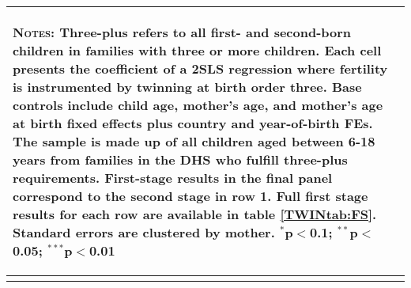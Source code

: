 \begin{table}[!htbp]
\begin{tabular}{lcccc}
\hline\multicolumn{5}{p{10.0cm}}{\begin{footnotesize}\textsc{Notes:} Three-plus refers to all first- and second-born children in families with three or more children.  Each cell presents the coefficient of a 2SLS regression where fertility is instrumented by twinning at birth order three.  Base controls include child age, mother's age, and mother's age at birth fixed effects plus country and year-of-birth FEs.  The sample is made up of all children aged between 6-18 years from families in the DHS who fulfill three-plus requirements. First-stage results in the final panel correspond to the second stage in row 1.  Full first stage results for each row are available in table \ref{TWINtab:FS}. Standard errors are clustered by mother. 
$^{*}$p$<$0.1; $^{**}$p$<$0.05; $^{***}$p$<$0.01\end{footnotesize}}
\\\bottomrule\normalsize\end{tabular}\end{table} 
